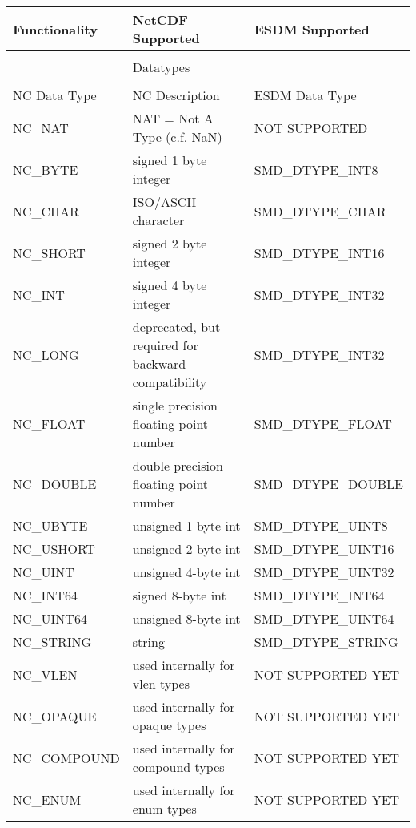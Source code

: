 \begin{table}[H]
\centering
\begin{tabular}{|l|l|l|}
\hline
Functionality & NetCDF Supported & ESDM Supported \\ \hline \hline

& & \\
& \large{Datatypes} & \\
& & \\ \hline \hline

NC Data Type  &  NC Description  & ESDM Data Type  \\ \hline

NC\_NAT & NAT = Not A Type (c.f. NaN) &     NOT SUPPORTED        \\ \hline
NC\_BYTE & signed 1 byte integer &     SMD\_DTYPE\_INT8        \\ \hline
NC\_CHAR & ISO/ASCII character &      SMD\_DTYPE\_CHAR       \\ \hline
NC\_SHORT & signed 2 byte integer &   SMD\_DTYPE\_INT16          \\ \hline
NC\_INT & signed 4 byte integer &     SMD\_DTYPE\_INT32        \\ \hline
NC\_LONG & deprecated, but required for backward compatibility &    SMD\_DTYPE\_INT32         \\ \hline
NC\_FLOAT & single precision floating point number &   SMD\_DTYPE\_FLOAT           \\ \hline
NC\_DOUBLE & double precision floating point number &   SMD\_DTYPE\_DOUBLE          \\ \hline
NC\_UBYTE & unsigned 1 byte int &     SMD\_DTYPE\_UINT8        \\ \hline
NC\_USHORT & unsigned 2-byte int &    SMD\_DTYPE\_UINT16         \\ \hline
NC\_UINT & unsigned 4-byte int &   SMD\_DTYPE\_UINT32          \\ \hline
NC\_INT64 & signed 8-byte int &    SMD\_DTYPE\_INT64         \\ \hline
NC\_UINT64 & unsigned 8-byte int &    SMD\_DTYPE\_UINT64         \\ \hline
NC\_STRING & string &    SMD\_DTYPE\_STRING         \\ \hline
NC\_VLEN & used internally for vlen types &      NOT SUPPORTED YET       \\ \hline
NC\_OPAQUE & used internally for opaque types &     NOT SUPPORTED YET        \\ \hline
NC\_COMPOUND & used internally for compound types &    NOT SUPPORTED YET         \\ \hline
NC\_ENUM & used internally for enum types &       NOT SUPPORTED YET      \\ \hline \hline


\end{tabular}
\end{table}
